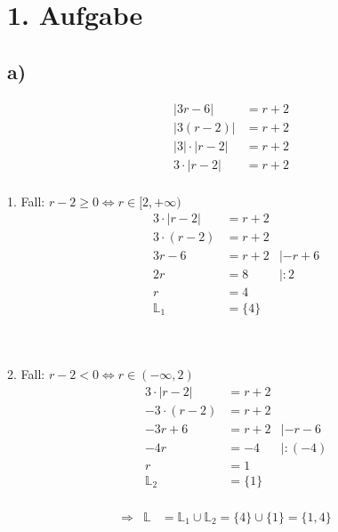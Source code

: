 \documentclass[]{article}
\newcommand{\eq}{\Leftrightarrow}
\newcommand{\rarr}{\Rightarrow}
\begin{document}
\section*{1. Aufgabe}
\subsection*{a)}
\begin{align*}
	&& |3r-6| &= r+2&&\\
	&& |3(r-2)| &= r+2&&\\
	&& |3|\cdot|r-2| &= r+2&&\\
	&& 3\cdot|r-2| &= r+2&&\\
\end{align*}
\begin{center}\begin{minipage}{0.45\textwidth}
	1. Fall: $r-2 \geq 0 \eq r \in [2, +\infty)$
	\begin{align*}
		&& 3\cdot|r-2| &= r+2&&\\
		&& 3\cdot(r-2) &= r+2&&\\
		&& 3r-6&= r+2&|-r+6&\\
		&& 2r&= 8&|:2&\\
		&& r&= 4&&\\
		&& \mathbb{L}_1&= \{4\}&&\\
	\end{align*}
\end{minipage} ~\vline~ \begin{minipage}{0.45\textwidth}
	2. Fall: $r-2 < 0 \eq r \in (-\infty,2)$
	\begin{align*}
		&& 3\cdot|r-2| &= r+2&&\\
		&& -3\cdot(r-2) &= r+2&&\\
		&& -3r+6 &= r+2&|-r-6&\\
		&& -4r &= -4&|:(-4)&\\
		&& r &= 1&&\\
		&& \mathbb{L}_2&= \{1\}&&\\
	\end{align*}
\end{minipage}\end{center}
\begin{align*}
	&\rarr& \mathbb{L}&= \mathbb{L}_1 \cup \mathbb{L}_2 = \{4\} \cup \{1\} = \{1,4\} &&\\
\end{align*}
\end{document}
